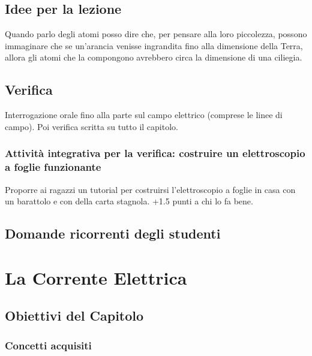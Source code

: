 \documentclass[11pt]{report}
\begin{document}
\section*{Idee per la lezione}
Quando parlo degli atomi posso dire che, per pensare alla loro piccolezza, possono immaginare che se un'arancia venisse ingrandita fino alla dimensione della Terra, allora gli atomi che la compongono avrebbero circa la dimensione di una ciliegia.

\section*{Verifica}
Interrogazione orale fino alla parte sul campo elettrico (comprese le linee di campo). Poi verifica scritta su tutto il capitolo.

\subsection*{Attività integrativa per la verifica: costruire un elettroscopio a foglie funzionante}
Proporre ai ragazzi un tutorial per costruirsi l'elettroscopio a foglie in casa con un barattolo e con della carta stagnola. +1.5 punti a chi lo fa bene.

\section*{Domande ricorrenti degli studenti}

\chapter{La Corrente Elettrica}

\section*{Obiettivi del Capitolo}

\subsection*{Concetti acquisiti}
\end{document}
